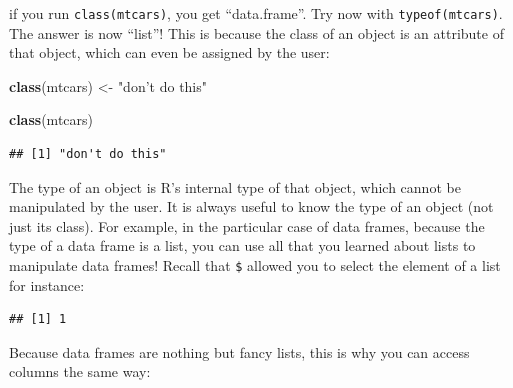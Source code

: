 \documentclass[]{gitbook}
\newenvironment{Shaded}{\begin{snugshade}}{\end{snugshade}}
\newcommand{\DecValTok}[1]{\textcolor[rgb]{0.00,0.00,0.81}{#1}}
\newcommand{\KeywordTok}[1]{\textcolor[rgb]{0.13,0.29,0.53}{\textbf{#1}}}
\newcommand{\NormalTok}[1]{#1}
\newcommand{\OperatorTok}[1]{\textcolor[rgb]{0.81,0.36,0.00}{\textbf{#1}}}
\newcommand{\StringTok}[1]{\textcolor[rgb]{0.31,0.60,0.02}{#1}}
\begin{document}
if you run \texttt{class(mtcars)}, you get ``data.frame''. Try now with \texttt{typeof(mtcars)}. The answer is now
``list''! This is because the class of an object is an attribute of that object, which can even
be assigned by the user:

\begin{Shaded}
\begin{Highlighting}[]
\KeywordTok{class}\NormalTok{(mtcars) <-}\StringTok{ "don't do this"}

\KeywordTok{class}\NormalTok{(mtcars)}
\end{Highlighting}
\end{Shaded}

\begin{verbatim}
## [1] "don't do this"
\end{verbatim}

The type of an object is R's internal type of that object, which cannot be manipulated by the user.
It is always useful to know the type of an object (not just its class). For example, in the particular
case of data frames, because the type of a data frame is a list, you can use all that you learned
about lists to manipulate data frames! Recall that \texttt{\$} allowed you to select the element of a list
for instance:

\begin{Shaded}
\end{Shaded}

\begin{verbatim}
## [1] 1
\end{verbatim}

Because data frames are nothing but fancy lists, this is why you can access columns the same way:

\begin{Shaded}
\end{Shaded}
\end{document}
